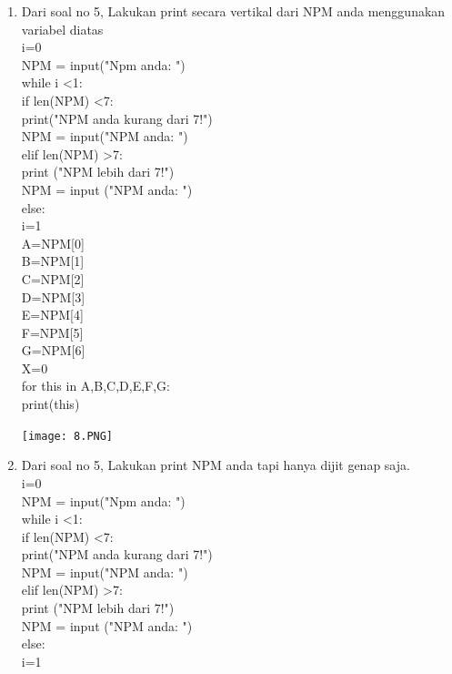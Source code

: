 \documentclass{article}
\begin{document}
\begin{enumerate}
\item Dari soal no 5, Lakukan print secara vertikal dari NPM anda menggunakan variabel diatas\\
i=0\\
NPM = input("Npm anda: ")\\
while i <1:\\
    if len(NPM) <7:\\
        print("NPM anda kurang dari 7!")\\
        NPM = input("NPM anda: ")\\
    elif len(NPM) >7:\\
        print ("NPM lebih dari 7!")\\
        NPM = input ("NPM anda: ")\\
    else:\\
        i=1\\

A=NPM[0]\\
B=NPM[1]\\
C=NPM[2]\\
D=NPM[3]\\
E=NPM[4]\\
F=NPM[5]\\
G=NPM[6]\\

X=0\\

for this in A,B,C,D,E,F,G:\\
    print(this)\\
\begin{center}
    \texttt{[image: 8.PNG]}
\end{center}

\item Dari soal no 5, Lakukan print NPM anda tapi hanya dijit genap saja.\\
i=0\\
NPM = input("Npm anda: ")\\
while i <1:\\
    if len(NPM) <7:\\
        print("NPM anda kurang dari 7!")\\
        NPM = input("NPM anda: ")\\
    elif len(NPM) >7:\\
        print ("NPM lebih dari 7!")\\
        NPM = input ("NPM anda: ")\\
    else:\\
        i=1\\


\end{enumerate}
\end{document}
